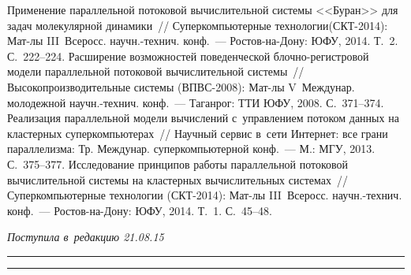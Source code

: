 \begin{multicols}{2}
{{\begin{thebibliography}{99}
   Применение 
параллельной потоковой вы\-чис\-лительной сис\-те\-мы <<Буран>> для задач 
молекулярной динами\-ки~// Суперкомпьютерные технологии\linebreak (СКТ-2014):  
Мат-лы III~Всеросс. научн.-технич. конф.~--- Ростов-на-Дону: ЮФУ, 2014. 
Т.~2. С.~222--224.
   Рас\-ши\-ре\-ние возможностей 
поведенческой блоч\-но-ре\-гист\-ро\-вой модели параллельной потоковой 
вы\-чис\-ли\-тель\-ной системы~// Высокопроизводительные 
системы (ВПВС-2008): Мат-лы V~Междунар. молодежной научн.-технич. 
конф.~--- Таганрог: ТТИ ЮФУ, 2008. С.~371--374.
   Реализация 
параллельной модели вычислений с~управлением потоком данных на 
кластерных суперкомпьютерах~// Научный сервис в~сети Интернет: все грани 
параллелизма: Тр. Междунар. суперкомпьютерной конф.~--- М.: МГУ, 2013. 
С.~375--377.
   Исследование принципов 
работы параллельной потоковой вы\-чис\-ли\-тель\-ной системы на кластерных 
вычислительных системах~// Суперкомпьютерные технологии (СКТ-2014): 
Мат-лы III~Всеросс. научн.-технич. конф.~--- Рос\-тов-на-До\-ну: ЮФУ, 2014. 
Т.~1. С.~45--48.
 \end{thebibliography}

 }
 }

\end{multicols}

\vspace*{-3pt}

\hfill{\small\textit{Поступила в~редакцию 21.08.15}}

\vspace*{8pt}



\hrule

\vspace*{2pt}

\hrule

\vspace*{8pt}

\def\tit{DATAFLOW COMPUTING MODEL AS~A~PARADIGM OF~FUTURE 
MAINSTREAM OF~SOFTWARE DEVELOPMENT}

\def\titkol{Dataflow computing model as~a~paradigm of~future 
mainstream of~software development}

